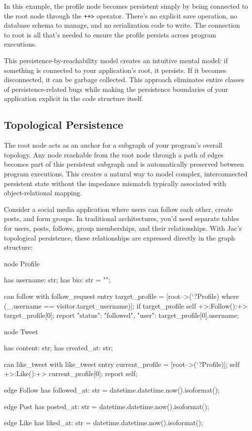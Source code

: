 In this example, the profile node becomes persistent simply by being connected to the root node through the \texttt{++>} operator. There's no explicit save operation, no database schema to manage, and no serialization code to write. The connection to root is all that's needed to ensure the profile persists across program executions.

This persistence-by-reachability model creates an intuitive mental model: if something is connected to your application's root, it persists. If it becomes disconnected, it can be garbage collected. This approach eliminates entire classes of persistence-related bugs while making the persistence boundaries of your application explicit in the code structure itself.

\subsection{Topological Persistence}

The root node acts as an anchor for a subgraph of your program's overall topology. Any node reachable from the root node through a path of edges becomes part of this persistent subgraph and is automatically preserved between program executions. This creates a natural way to model complex, interconnected persistent state without the impedance mismatch typically associated with object-relational mapping.

Consider a social media application where users can follow each other, create posts, and form groups. In traditional architectures, you'd need separate tables for users, posts, follows, group memberships, and their relationships. With Jac's topological persistence, these relationships are expressed directly in the graph structure:

\begin{jacblock}
node Profile {
    has username: str;
    has bio: str = "";

    can follow with follow_request entry {
        target_profile = [root-->(`?Profile) where (_.username == visitor.target_username)];
        if target_profile {
            self +>:Follow():+> target_profile[0];
            report {"status": "followed", "user": target_profile[0].username};
        }
    }
}

node Tweet {
    has content: str;
    has created_at: str;

    can like_tweet with like_tweet entry {
        current_profile = [root-->(`?Profile)];
        self +>:Like():+> current_profile[0];
        report self;
    }
}

edge Follow {
    has followed_at: str = datetime.datetime.now().isoformat();
}

edge Post {
    has posted_at: str = datetime.datetime.now().isoformat();
}

edge Like {
    has liked_at: str = datetime.datetime.now().isoformat();
}
\end{jacblock}

